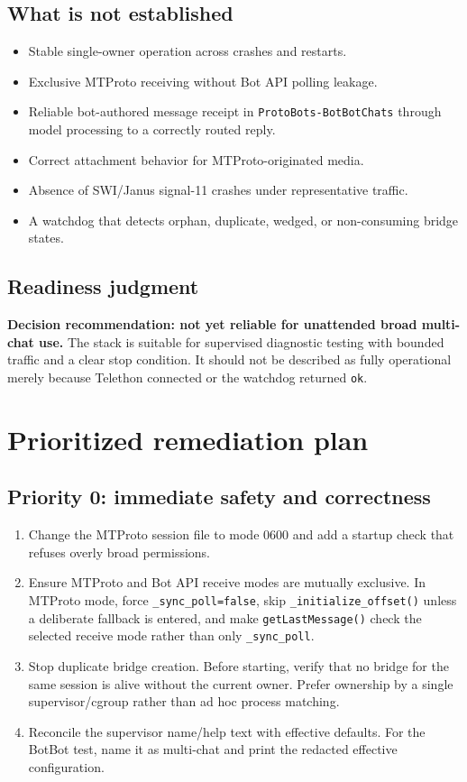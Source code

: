 \documentclass[10pt]{article}
\newcommand{\code}[1]{\texttt{#1}}
\begin{document}
\subsection{What is not established}

\begin{itemize}
  \item Stable single-owner operation across crashes and restarts.
  \item Exclusive MTProto receiving without Bot API polling leakage.
  \item Reliable bot-authored message receipt in \code{ProtoBots-BotBotChats} through model processing to a correctly routed reply.
  \item Correct attachment behavior for MTProto-originated media.
  \item Absence of SWI/Janus signal-11 crashes under representative traffic.
  \item A watchdog that detects orphan, duplicate, wedged, or non-consuming bridge states.
\end{itemize}

\subsection{Readiness judgment}

\textbf{Decision recommendation: not yet reliable for unattended broad multi-chat use.} The stack is suitable for supervised diagnostic testing with bounded traffic and a clear stop condition. It should not be described as fully operational merely because Telethon connected or the watchdog returned \code{ok}.

\section{Prioritized remediation plan}

\subsection{Priority 0: immediate safety and correctness}

\begin{enumerate}
  \item Change the MTProto session file to mode 0600 and add a startup check that refuses overly broad permissions.
  \item Ensure MTProto and Bot API receive modes are mutually exclusive. In MTProto mode, force \code{\_sync\_poll=false}, skip \code{\_initialize\_offset()} unless a deliberate fallback is entered, and make \code{getLastMessage()} check the selected receive mode rather than only \code{\_sync\_poll}.
  \item Stop duplicate bridge creation. Before starting, verify that no bridge for the same session is alive without the current owner. Prefer ownership by a single supervisor/cgroup rather than ad hoc process matching.
  \item Reconcile the supervisor name/help text with effective defaults. For the BotBot test, name it as multi-chat and print the redacted effective configuration.
\end{enumerate}
\end{document}
